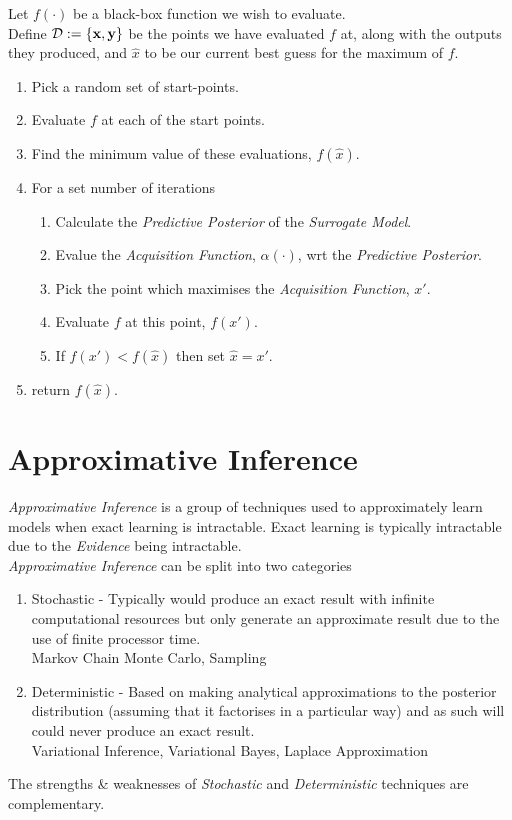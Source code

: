 \documentclass[11pt,a4paper]{article}
\begin{document}
Let $f(\cdot)$ be a black-box function we wish to evaluate.\\
Define $\mathcal{D}:=\{\textbf{x},\textbf{y}\}$ be the points we have evaluated $f$ at, along with the outputs they produced, and $\hat{x}$ to be our current best guess for the maximum of $f$.
\begin{enumerate}
	\item Pick a random set of start-points.
	\item Evaluate $f$ at each of the start points.
	\item Find the minimum value of these evaluations, $f(\hat{x})$.
	\item For a set number of iterations
		\begin{enumerate}
			\item Calculate the \textit{Predictive Posterior} of the \textit{Surrogate Model}.
			\item Evalue the \textit{Acquisition Function}, $\alpha(\cdot)$, wrt the \textit{Predictive Posterior}.
			\item Pick the point which maximises the \textit{Acquisition Function}, $x'$.
			\item Evaluate $f$ at this point, $f(x')$.
			\item If $f(x')<f(\hat{x})$ then set $\hat{x}=x'$.
		\end{enumerate}
	\item return $f(\hat{x})$.
\end{enumerate}

\section{Approximative Inference}

\textit{Approximative Inference} is a group of techniques used to approximately learn models when exact learning is intractable. Exact learning is typically intractable due to the \textit{Evidence} being intractable.\\
\textit{Approximative Inference} can be split into two categories
\begin{enumerate}
	\item Stochastic - Typically would produce an exact result with infinite computational resources but only generate an approximate result due to the use of finite processor time.\\
	\eg Markov Chain Monte Carlo, Sampling
	\item Deterministic - Based on making analytical approximations to the posterior distribution (\eg assuming that it factorises in a particular way) and as such will could never produce an exact result.\\
	\eg Variational Inference, Variational Bayes, Laplace Approximation
\end{enumerate}
\nb The strengths \& weaknesses of \textit{Stochastic} and \textit{Deterministic} techniques are complementary.
\end{document}
